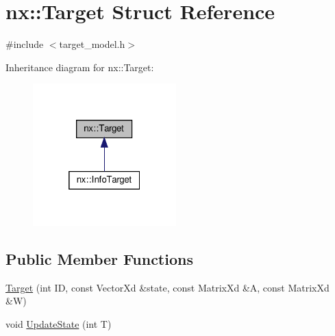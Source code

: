 \hypertarget{structnx_1_1Target}{}\section{nx\+:\+:Target Struct Reference}
\label{structnx_1_1Target}


{\ttfamily \#include $<$target\+\_\+model.\+h$>$}



Inheritance diagram for nx\+:\+:Target\+:
\nopagebreak
\begin{figure}[H]
\begin{center}
\leavevmode
\includegraphics[width=157pt]{structnx_1_1Target__inherit__graph}
\end{center}
\end{figure}
\subsection*{Public Member Functions}
\begin{DoxyCompactItemize}
\item 
\hyperlink{structnx_1_1Target_aff71c457fa00ebbfd439d351a5574767}{Target} (int ID, const Vector\+Xd \&state, const Matrix\+Xd \&A, const Matrix\+Xd \&W)
\item 
void \hyperlink{structnx_1_1Target_a5a8c9703ee9250441895e9e7930408b0}{Update\+State} (int T)
\end{DoxyCompactItemize}
